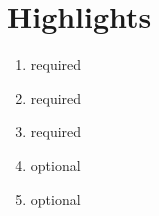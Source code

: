 \section*{Highlights}

\begin{enumerate}
\item required
\item required
\item required
\item optional
\item optional
\end{enumerate}
